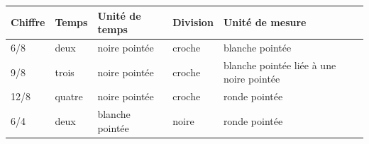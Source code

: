 \begin{tabular}{@{}l l l l l@{}}
\toprule
\textbf{Chiffre} & \textbf{Temps} & \textbf{Unité de temps} & \textbf{Division} & \textbf{Unité de mesure} \\
\midrule
6/8 & deux & noire pointée & croche & blanche pointée \\
9/8 & trois & noire pointée & croche & blanche pointée liée à une noire pointée \\
12/8 & quatre & noire pointée & croche & ronde pointée \\
6/4 & deux & blanche pointée & noire & ronde pointée \\
\bottomrule
\end{tabular}
